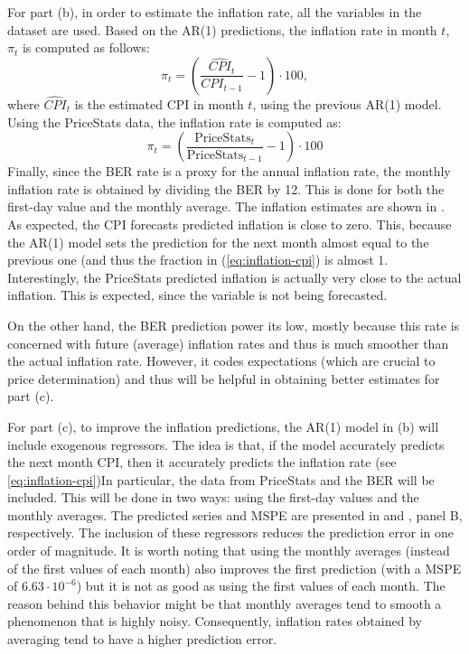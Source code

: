 \documentclass[11pt, english]{article}
\begin{document}
\begin{multicols}{2}
For part (b), in order to estimate the inflation rate, all the variables in the dataset are used. Based on the AR(1) predictions, the inflation rate in month $t$, $\pi_{t}$ is computed as follows:
	\begin{equation} \label{eq:inflation-cpi}
		\pi_{t} = \left(\frac{\widehat{CPI}_{t}}{CPI_{t-1}} - 1\right) \cdot 100,
	\end{equation}
where $\widehat{CPI}_{t}$ is the estimated CPI in month $t$, using the previous AR(1) model. Using the PriceStats data, the inflation rate is computed as:
	$$\pi_{t} = \left(\frac{\text{PriceStats}_{t}}{\text{PriceStats}_{t-1}} - 1 \right) \cdot 100$$
Finally, since the BER rate is a proxy for the annual inflation rate, the monthly inflation rate is obtained by dividing the BER by 12. This is done for both the first-day value and the monthly average. The inflation estimates are shown in . As expected, the CPI forecasts predicted inflation is close to zero. This, because the AR(1) model sets the prediction for the next month almost equal to the previous one (and thus the fraction in (\ref{eq:inflation-cpi}) is almost 1. Interestingly, the PriceStats predicted inflation is actually very close to the actual inflation. This is expected, since the variable is not being forecasted.

On the other hand, the BER prediction power its low, mostly because this rate is concerned with future (average) inflation rates and thus is much smoother than the actual inflation rate. However, it codes expectations (which are crucial to price determination) and thus will be helpful in obtaining better estimates for part (c).

For part (c), to improve the inflation predictions, the AR(1) model in (b) will include exogenous regressors. The idea is that, if the model accurately predicts the next month CPI, then it accurately predicts the inflation rate (see \ref{eq:inflation-cpi})In particular, the data from PriceStats and the BER will be included. This will be done in two ways: using the first-day values and the monthly averages. The predicted series and MSPE are presented in  and , panel B, respectively. The inclusion of these regressors reduces the prediction error in one order of magnitude. It is worth noting that using the monthly averages (instead of the first values of each month) also improves the first prediction (with a MSPE of $6.63 \cdot 10^{-6}$) but it is not as good as using the first values of each month. The reason behind this behavior might be that monthly averages tend to smooth a phenomenon that is highly noisy. Consequently, inflation rates obtained by averaging tend to have a higher prediction error.


\end{multicols}
\end{document}

